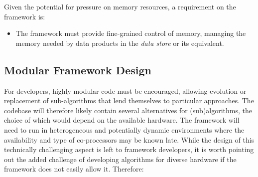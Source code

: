 \documentclass[../main-v1.tex]{subfiles}
\begin{document}

Given the potential for pressure on memory resources, a requirement on the framework is:

\begin{itemize}
    \item The framework must provide fine-grained control of memory, managing the memory needed by data products in the {\it data store} or its equivalent.
\end{itemize}


\subsection{Modular Framework Design}

For developers, highly modular code must be encouraged, allowing evolution or replacement of sub-algorithms that lend themselves to particular approaches.
The codebase will therefore likely contain several alternatives for (sub)algorithms, the choice of which would depend on the available hardware.  The framework will need to run in heterogeneous and potentially dynamic environments where the availability and type of co-processors may be known late.  While the design of this technically challenging aspect is left to framework developers, it is worth pointing out the added challenge of developing algorithms for diverse hardware if the framework does not easily allow it.  Therefore:
\end{document}
